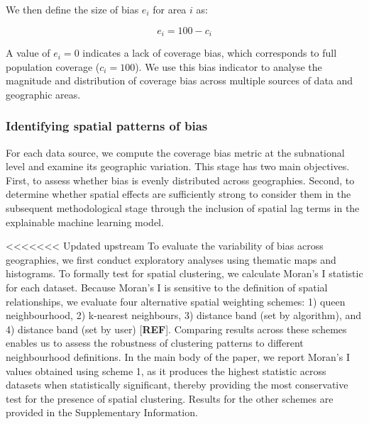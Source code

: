 \documentclass[]{rsos}%
\begin{document}
We then define the size of bias \(e_i\) for area \(i\) as:

\begin{equation} \label{eq:size-bias}
e_i = 100 - c_i
\end{equation}

A value of \(e_i = 0\) indicates a lack of coverage bias, which
corresponds to full population coverage (\(c_i = 100\)). We use this bias
indicator to analyse the magnitude and distribution of coverage bias
across multiple sources of data and geographic areas.

\subsubsection{Identifying spatial patterns of bias}\label{identifying-spatial-patterns-of-bias}

For each data source, we compute the coverage bias metric at the
subnational level and examine its geographic variation. This stage has
two main objectives. First, to assess whether bias is evenly distributed
across geographies. Second, to determine whether spatial effects are
sufficiently strong to consider them in the subsequent methodological
stage through the inclusion of spatial lag terms in the explainable
machine learning model.

<<<<<<< Updated upstream
To evaluate the variability of bias across geographies, we first conduct
exploratory analyses using thematic maps and histograms. To formally
test for spatial clustering, we calculate Moran's I statistic for each
dataset. Because Moran's I is sensitive to the definition of spatial
relationships, we evaluate four alternative spatial weighting schemes:
1) queen neighbourhood, 2) k-nearest neighbours, 3) distance band (set
by algorithm), and 4) distance band (set by user) {[}\textbf{REF}{]}. Comparing
results across these schemes enables us to assess the robustness of
clustering patterns to different neighbourhood definitions. In the main
body of the paper, we report Moran's I values obtained using scheme 1,
as it produces the highest statistic across datasets when statistically
significant, thereby providing the most conservative test for the
presence of spatial clustering. Results for the other schemes are
provided in the Supplementary Information.
\end{document}
